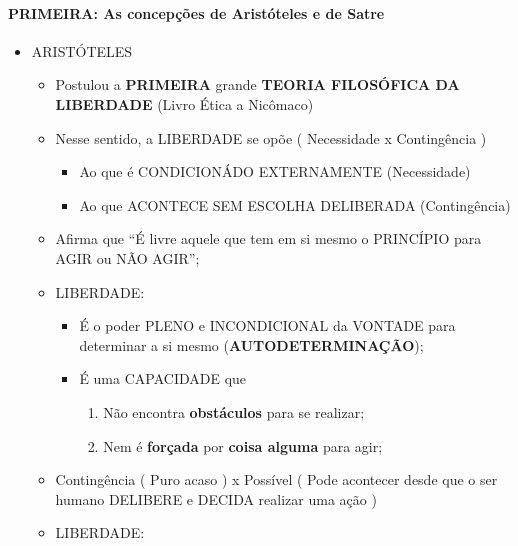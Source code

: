 \documentclass[
]{book}
\providecommand{\tightlist}{%
  \setlength{\itemsep}{0pt}\setlength{\parskip}{0pt}}
\begin{document}
\hypertarget{primeira-as-concepuxe7uxf5es-de-aristuxf3teles-e-de-satre}{%
\paragraph{PRIMEIRA: As concepções de Aristóteles e de Satre}\label{primeira-as-concepuxe7uxf5es-de-aristuxf3teles-e-de-satre}}

\begin{itemize}
\tightlist
\item
  ARISTÓTELES

  \begin{itemize}
  \tightlist
  \item
    Postulou a \textbf{PRIMEIRA} grande \textbf{TEORIA FILOSÓFICA DA LIBERDADE} (Livro Ética a Nicômaco)
  \item
    Nesse sentido, a LIBERDADE se opõe ( Necessidade x Contingência )

    \begin{itemize}
    \tightlist
    \item
      Ao que é CONDICIONÁDO EXTERNAMENTE (Necessidade)
    \item
      Ao que ACONTECE SEM ESCOLHA DELIBERADA (Contingência)
    \end{itemize}
  \item
    Afirma que ``É livre aquele que tem em si mesmo o PRINCÍPIO para AGIR ou NÃO AGIR'';
  \item
    LIBERDADE:

    \begin{itemize}
    \tightlist
    \item
      É o poder PLENO e INCONDICIONAL da VONTADE para determinar a si mesmo (\textbf{AUTODETERMINAÇÃO});
    \item
      É uma CAPACIDADE que

      \begin{enumerate}
      \def\labelenumi{\alph{enumi}.}
      \tightlist
      \item
        Não encontra \textbf{obstáculos} para se realizar;
      \item
        Nem é \textbf{forçada} por \textbf{coisa alguma} para agir;
      \end{enumerate}
    \end{itemize}
  \item
    Contingência ( Puro acaso ) x Possível ( Pode acontecer desde que o ser humano DELIBERE e DECIDA realizar uma ação )
  \item
    LIBERDADE:


\end{itemize}
\end{itemize}
\end{document}
